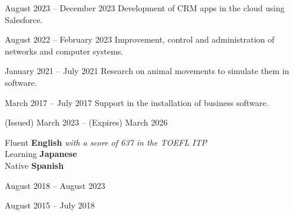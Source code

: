 \documentclass[a4paper,11pt]{memoir} %
\begin{document}
\userinformation %

\framebreak %


\heading{\fullname} %



\Sep


{August 2023 -- December 2023}
{Development of CRM apps in the cloud using Salesforce.}

{August 2022 -- February 2023}
{Improvement, control and administration of networks and computer systems.}

{January 2021 -- July 2021}
{Research on animal movements to simulate them in software.}

{March 2017 -- July 2017}
{Support in the installation of business software.}

\Sep


{(Issued) March 2023 -- (Expires) March 2026}{}

\Sep


\techtable

\Sep


\bluebullet Fluent \textbf{English} \textit{with a score of 637 in the TOEFL ITP} \\
\bluebullet Learning \textbf{Japanese} \\
\bluebullet Native \textbf{Spanish} \\


{August 2018 -- August 2023}{}

{August 2015 -- July 2018}{}

\end{document}
